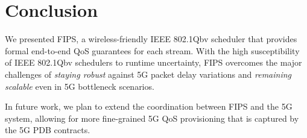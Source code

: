 \section{Conclusion} \label{sec:conclusion}
We presented FIPS, a wireless-friendly IEEE 802.1Qbv scheduler that provides formal end-to-end QoS guarantees for each stream.
With the high susceptibility of IEEE 802.1Qbv schedulers to runtime uncertainty, FIPS overcomes the major challenges of \textit{staying robust} against 5G packet delay variations and \textit{remaining scalable} even in 5G bottleneck scenarios.

In future work, we plan to extend the coordination between FIPS and the 5G system, allowing for more fine-grained 5G QoS provisioning that is captured by the 5G PDB contracts.
